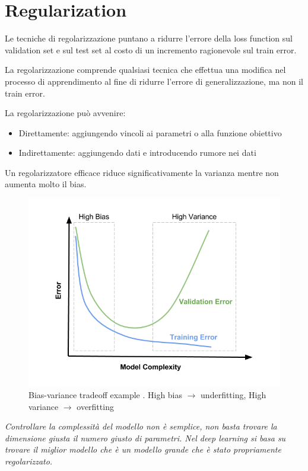 \chapter{Regularization}
Le tecniche di regolarizzazione puntano a ridurre l'errore della loss function sul validation set e sul test set al costo di un
incremento ragionevole sul train error.

La regolarizzazione comprende qualsiasi tecnica che effettua una modifica nel processo di apprendimento al fine di
ridurre l'errore di generalizzazione, ma non il train error.

La regolarizzazione può avvenire:
\begin{itemize}
  \item Direttamente: aggiungendo vincoli ai parametri o alla funzione obiettivo
  \item Indirettamente: aggiungendo dati e introducendo rumore nei dati
\end{itemize}

Un regolarizzatore efficace riduce significativamente la varianza mentre non aumenta molto il bias.

\begin{figure}[ht]
  \centering
  \includegraphics[width=0.8\linewidth]{images/Bias-Variance-Tradeoff-In-Machine-Learning-1.png}
  \caption{Bias-variance tradeoff example \cite{img:model-complexity}. High bias $\rightarrow$ underfitting,  High variance $\rightarrow$ overfitting}
\end{figure}


\textit{Controllare la complessità del modello non è semplice, non basta trovare la dimensione giusta il numero giusto di parametri.
  Nel deep learning si basa su trovare il miglior modello che è un modello grande che è stato propriamente regolarizzato.
}

